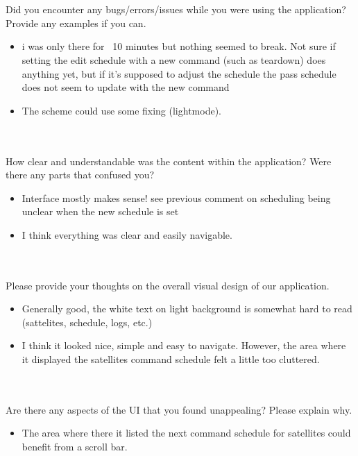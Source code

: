 \documentclass[12pt, titlepage]{article}
\begin{document}
\\ \\

Did you encounter any bugs/errors/issues while you were using the application? Provide any examples if you can.

\begin{itemize}
    \item i was only there for ~10 minutes but nothing seemed to break. Not sure if setting the edit schedule with a new command (such as teardown) does anything yet, but if it's supposed to adjust the schedule the pass schedule does not seem to update with the new command
    \item The scheme could use some fixing (light\dark mode).
\end{itemize}

\\ \\

How clear and understandable was the content within the application? Were there any parts that confused you?

\begin{itemize}
    \item Interface mostly makes sense! see previous comment on scheduling being unclear when the new schedule is set
    \item I think everything was clear and easily navigable.
\end{itemize}

\\ \\

Please provide your thoughts on the overall visual design of our application. 

\begin{itemize}
    \item Generally good, the white text on light background is somewhat hard to read (sattelites, schedule, logs, etc.)
    \item I think it looked nice, simple and easy to navigate. However, the area where it displayed the satellites command schedule felt a little too cluttered.
\end{itemize}

\\ \\

Are there any aspects of the UI that you found unappealing? Please explain why.

\begin{itemize}
    \item The area where there it listed the next command schedule for satellites could benefit from a scroll bar.
\end{itemize}
\end{document}
